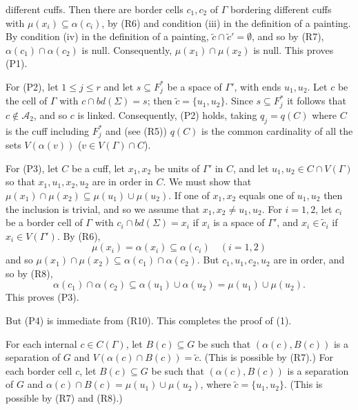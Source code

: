 \noindent different cuffs. Then there are border cells $c_1, c_2$ of $\Gamma$ bordering different cuffs with $\mu(x_i) \subseteq \alpha(c_i)$, by (R6) and condition (iii) in the definition of a painting. By condition (iv) in the definition of a painting, $\tilde{c} \cap \tilde{c}' = \emptyset$, and so by (R7), $\alpha(c_1) \cap \alpha(c_2)$ is null. Consequently, $\mu(x_1) \cap \mu(x_2)$ is null. This proves (P1).

For (P2), let $1 \le j \le r$ and let $s \subseteq F_j^*$ be a space of $\Gamma'$, with ends $u_1, u_2$. Let $c$ be the cell of $\Gamma$ with $c \cap bd(\Sigma) = s$; then $\tilde{c} = \{u_1, u_2\}$. Since $s \subseteq F_j^*$ it follows that $c \not\in \mathcal{A}_2$, and so $c$ is linked. Consequently, (P2) holds, taking $q_j = q(C)$ where $C$ is the cuff including $F_j^*$ and (see (R5)) $q(C)$ is the common cardinality of all the sets $V(\alpha(v))$ ($v \in V(\Gamma) \cap C$).

For (P3), let $C$ be a cuff, let $x_1, x_2$ be units of $\Gamma'$ in $C$, and let $u_1, u_2 \in C \cap V(\Gamma)$ so that $x_1, u_1, x_2, u_2$ are in order in $C$. We must show that $\mu(x_1) \cap \mu(x_2) \subseteq \mu(u_1) \cup \mu(u_2)$. If one of $x_1, x_2$ equals one of $u_1, u_2$ then the inclusion is trivial, and so we assume that $x_1, x_2 \ne u_1, u_2$. For $i = 1, 2$, let $c_i$ be a border cell of $\Gamma$ with $c_i \cap bd(\Sigma) = x_i$ if $x_i$ is a space of $\Gamma'$, and $x_i \in \tilde{c}_i$ if $x_i \in V(\Gamma')$. By (R6),
\begin{equation*}
\mu(x_i) = \alpha(x_i) \subseteq \alpha(c_i) \quad (i = 1, 2)
\end{equation*}
and so $\mu(x_1) \cap \mu(x_2) \subseteq \alpha(c_1) \cap \alpha(c_2)$. But $c_1, u_1, c_2, u_2$ are in order, and so by (R8),
\begin{equation*}
\alpha(c_1) \cap \alpha(c_2) \subseteq \alpha(u_1) \cup \alpha(u_2) = \mu(u_1) \cup \mu(u_2).
\end{equation*}
This proves (P3).

But (P4) is immediate from (R10). This completes the proof of (1).

For each internal $c \in C(\Gamma)$, let $B(c) \subseteq G$ be such that $(\alpha(c), B(c))$ is a separation of $G$ and $V(\alpha(c) \cap B(c)) = \tilde{c}$. (This is possible by (R7).) For each border cell $c$, let $B(c) \subseteq G$ be such that $(\alpha(c), B(c))$ is a separation of $G$ and $\alpha(c) \cap B(c) = \mu(u_1) \cup \mu(u_2)$, where $\tilde{c} = \{u_1, u_2\}$. (This is possible by (R7) and (R8).)

